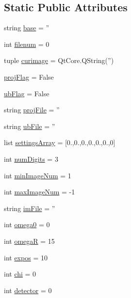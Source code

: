 \subsection*{Static Public Attributes}
\begin{DoxyCompactItemize}
\item 
string \hyperlink{class_project_1_1_project_a3fa761a117618c8524b700ceb2c7122f}{base} = ''
\item 
int \hyperlink{class_project_1_1_project_a9294abcb712f449838e46b3e98aa74f1}{filenum} = 0
\item 
tuple \hyperlink{class_project_1_1_project_aa523085a77fa7d77f1e8112dc95aa35b}{curimage} = Qt\-Core.\-Q\-String('')
\item 
\hyperlink{class_project_1_1_project_a24e1a52b21994951813562a80bfcdcad}{proj\-Flag} = False
\item 
\hyperlink{class_project_1_1_project_ad80180beff6260cee514b29e80083d55}{ub\-Flag} = False
\item 
string \hyperlink{class_project_1_1_project_aa2118a5e8c2024d900ce4cecf8d0bc5b}{proj\-File} = ''
\item 
string \hyperlink{class_project_1_1_project_add56cb764f050d4cbd41564b5de6bdf0}{ub\-File} = ''
\item 
list \hyperlink{class_project_1_1_project_a0d645f784cc44f878dc6bbaf86579517}{settings\-Array} = \mbox{[}0.,0.,0.,0.,0.,0.,0\mbox{]}
\item 
int \hyperlink{class_project_1_1_project_a441402412f2536707678ddc504873b29}{num\-Digits} = 3
\item 
int \hyperlink{class_project_1_1_project_a08ab65a606b424f1c03e20fc87df6907}{min\-Image\-Num} = 1
\item 
int \hyperlink{class_project_1_1_project_a4a71b55b2b2893cfa10f8375b75aab14}{max\-Image\-Num} = -\/1
\item 
string \hyperlink{class_project_1_1_project_ac2e36746ec209c56d0609cc99a0bc138}{im\-File} = ''
\item 
int \hyperlink{class_project_1_1_project_a5a62c4d934e7182c36b4f50bd590b29a}{omega0} = 0
\item 
int \hyperlink{class_project_1_1_project_ae5bb0d5790b39c1ba5185ee7cfdd6a0a}{omega\-R} = 15
\item 
int \hyperlink{class_project_1_1_project_a7f1d473c7f6210a62aca3991c0c3acc9}{expos} = 10
\item 
int \hyperlink{class_project_1_1_project_a2b04fbe0238d23490f6482a17046da9a}{chi} = 0
\item 
int \hyperlink{class_project_1_1_project_a51202b77e720d7d2c68c62ee982c372e}{detector} = 0
\end{DoxyCompactItemize}


